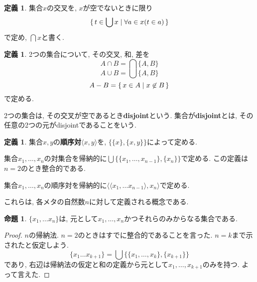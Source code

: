 \documentclass[a4paper, twoside]{bxjsarticle}
\theoremstyle{definition}
\newtheorem{prop}[thm]{命題}
\newtheorem{defn}[thm]{定義}
\begin{document}
            
        \begin{defn}
            集合$x$の交叉を, $x$が空でないときに限り\[\set{t \in \bigcup x | \forall a \in x (t \in a)}\]で定め, $\bigcap x$と書く. 
        \end{defn}
        \begin{defn}
            2つの集合について, その交叉, 和, 差を\[A \cap B = \bigcap \{A, B\}\]\[A \cup B = \bigcup \{A, B\}\]\[A - B = \set{x \in A | x \not\in B}\]で定める.
            
            2つの集合は, その交叉が空であるとき\textbf{disjoint}という.
            集合が\textbf{disjoint}とは, その任意の2つの元がdisjointであることをいう.
        \end{defn}
        \begin{defn}
            集合$x, y$の\textbf{順序対}$\langle x,y\rangle$を, $\{\{x\}, \{x, y\}\}$によって定める.
            
            集合$x_1, \dots , x_n$の対集合を帰納的に$\bigcup\{\{x_1, \dots , x_{n-1}\},\{x_n\}\}$で定める. この定義は$n=2$のとき整合的である.
            
            集合$x_1, \dots , x_n$の順序対を帰納的に$\langle \langle x_1, \dots x_{n-1} \rangle, x_n \rangle$で定める.
            
            これらは, 各メタの自然数$n$に対して定義される概念である.
        \end{defn}
        \begin{prop}
            $\{x_1, \dots x_n\}$は, 元として$x_1, \dots , x_n$かつそれらのみからなる集合である.
        \end{prop}
        \begin{proof}
            $n$の帰納法. $n=2$のときはすでに整合的であることを言った. $n=k$まで示されたと仮定しよう. \[\{x_1 \dots x_{k+1}\} = \bigcup\{\{x_1, \dots , x_k\},\{x_{k+1}\}\}\]であり, 右辺は帰納法の仮定と和の定義から元として$x_1, \dots , x_{k+1}$のみを持つ. よって言えた.
        \end{proof}
\end{document}
